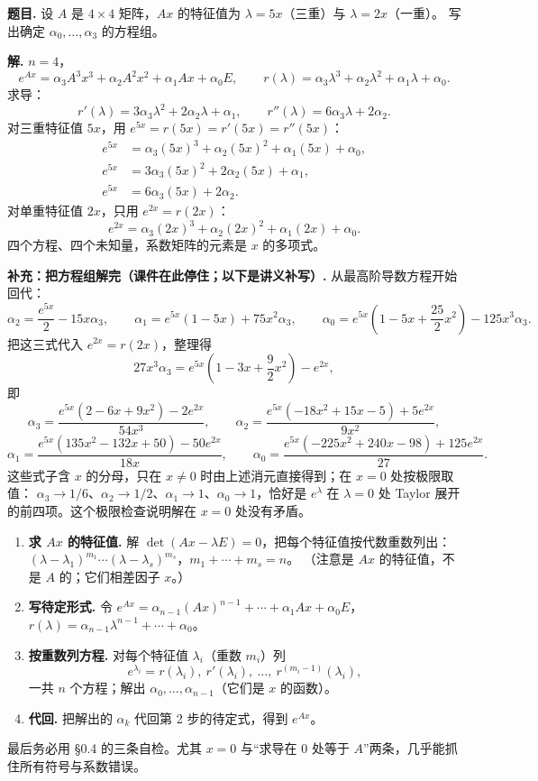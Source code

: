\documentclass[11pt]{ctexart}
\newcommand{\Ax}{Ax}
\begin{document}
\textbf{题目.} 设 $A$ 是 $4\times4$ 矩阵，$\Ax$ 的特征值为 $\lambda=5x$（三重）与 $\lambda=2x$（一重）。
写出确定 $\alpha_0,\dots,\alpha_3$ 的方程组。

\textbf{解.} $n=4$，
\[
e^{Ax}=\alpha_3A^3x^3+\alpha_2A^2x^2+\alpha_1\Ax+\alpha_0E,\qquad
r(\lambda)=\alpha_3\lambda^3+\alpha_2\lambda^2+\alpha_1\lambda+\alpha_0 .
\]
求导：
\[
r'(\lambda)=3\alpha_3\lambda^2+2\alpha_2\lambda+\alpha_1,\qquad
r''(\lambda)=6\alpha_3\lambda+2\alpha_2 .
\]
对三重特征值 $5x$，用 $e^{5x}=r(5x)=r'(5x)=r''(5x)$：
\[
\begin{aligned}
e^{5x}&=\alpha_3(5x)^3+\alpha_2(5x)^2+\alpha_1(5x)+\alpha_0,\\
e^{5x}&=3\alpha_3(5x)^2+2\alpha_2(5x)+\alpha_1,\\
e^{5x}&=6\alpha_3(5x)+2\alpha_2 .
\end{aligned}
\]
对单重特征值 $2x$，只用 $e^{2x}=r(2x)$：
\[
e^{2x}=\alpha_3(2x)^3+\alpha_2(2x)^2+\alpha_1(2x)+\alpha_0 .
\]
四个方程、四个未知量，系数矩阵的元素是 $x$ 的多项式。

\textbf{补充：把方程组解完（课件在此停住；以下是讲义补写）.} 从最高阶导数方程开始回代：
\[
\alpha_2=\frac{e^{5x}}2-15x\alpha_3,\qquad
\alpha_1=e^{5x}(1-5x)+75x^2\alpha_3,\qquad
\alpha_0=e^{5x}\left(1-5x+\frac{25}{2}x^2\right)-125x^3\alpha_3 .
\]
把这三式代入 $e^{2x}=r(2x)$，整理得
\[
27x^3\alpha_3=e^{5x}\left(1-3x+\frac92x^2\right)-e^{2x},
\]
即
\[
\alpha_3=\frac{e^{5x}(2-6x+9x^2)-2e^{2x}}{54x^3},\qquad
\alpha_2=\frac{e^{5x}(-18x^2+15x-5)+5e^{2x}}{9x^2},
\]
\[
\alpha_1=\frac{e^{5x}(135x^2-132x+50)-50e^{2x}}{18x},\qquad
\alpha_0=\frac{e^{5x}(-225x^2+240x-98)+125e^{2x}}{27}.
\]
这些式子含 $x$ 的分母，只在 $x\ne0$ 时由上述消元直接得到；在 $x=0$ 处按极限取值：
$\alpha_3\to1/6$、$\alpha_2\to1/2$、$\alpha_1\to1$、$\alpha_0\to1$，恰好是 $e^{\lambda}$ 在
$\lambda=0$ 处 Taylor 展开的前四项。这个极限检查说明解在 $x=0$ 处没有矛盾。


\begin{enumerate}
  \item \textbf{求 $\Ax$ 的特征值.} 解 $\det(\Ax-\lambda E)=0$，把每个特征值按代数重数列出：
        $(\lambda-\lambda_1)^{m_1}\cdots(\lambda-\lambda_s)^{m_s}$，$m_1+\cdots+m_s=n$。
        （注意是 $\Ax$ 的特征值，不是 $A$ 的；它们相差因子 $x$。）
  \item \textbf{写待定形式.} 令
        $e^{Ax}=\alpha_{n-1}(\Ax)^{n-1}+\cdots+\alpha_1\Ax+\alpha_0E$，
        $r(\lambda)=\alpha_{n-1}\lambda^{n-1}+\cdots+\alpha_0$。
  \item \textbf{按重数列方程.} 对每个特征值 $\lambda_i$（重数 $m_i$）列
        \[
        e^{\lambda_i}=r(\lambda_i),\ r'(\lambda_i),\ \dots,\ r^{(m_i-1)}(\lambda_i),
        \]
        一共 $n$ 个方程；解出 $\alpha_0,\dots,\alpha_{n-1}$（它们是 $x$ 的函数）。
  \item \textbf{代回.} 把解出的 $\alpha_k$ 代回第 2 步的待定式，得到 $e^{Ax}$。
\end{enumerate}
最后务必用 §0.4 的三条自检。尤其 $x=0$ 与“求导在 $0$ 处等于 $A$”两条，几乎能抓住所有符号与系数错误。
\end{document}
